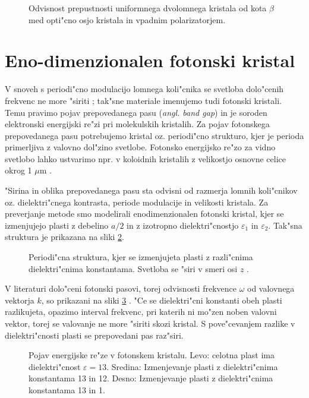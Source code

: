 \documentclass[12pt,twoside,openright,final,a4paper]{report}
\newcommand{\angl}[1]{(\textit{angl. #1})}
\begin{document}
\begin{figure}[h]
 
 \caption{Odvisnost prepustnosti uniformnega dvolomnega kristala od kota $\beta$ med opti"cno osjo kristala in vpadnim polarizatorjem. }
 \label{fig:test-uniform}
\end{figure}

\section{Eno-dimenzionalen fotonski kristal}
V snoveh s periodi"cno modulacijo lomnega koli"cnika se svetloba dolo"cenih frekvenc ne more "siriti \cite{hecht-nano,joannopoulos}; tak"sne materiale imenujemo tudi fotonski kristali. 
Temu pravimo pojav prepovedanega pasu \angl{band gap} in je soroden elektronski energijski re"zi pri molekulskih kristalih. 
Za pojav fotonskega prepovedanega pasu potrebujemo kristal oz. periodi"cno strukturo, kjer je perioda primerljiva z valovno dol"zino svetlobe. 
Fotonsko energijsko re"zo za vidno svetlobo lahko ustvarimo npr. v koloidnih kristalih z velikostjo osnovne celice okrog 1 $\mu$m \cite{colloidal-photonic-crystals}. 

"Sirina in oblika prepovedanega pasu sta odvisni od razmerja lomnih koli"cnikov oz. dielektri"cnega kontrasta, periode modulacije in velikosti kristala. 
Za preverjanje metode smo modelirali enodimenzionalen fotonski kristal, kjer se izmenjujejo plasti z debelino $a/2$ in z izotropno dielektri"cnostjo $\varepsilon_1$ in $\varepsilon_2$. 
Tak"sna struktura je prikazana na sliki \ref{fig:periodic-structure}. 

\begin{figure}[h]
 \centering
 
 \caption{Periodi"cna struktura, kjer se izmenjujeta plasti z razli"cnima dielektri"cnima konstantama. 
 Svetloba se "siri v smeri osi $z$ \cite{joannopoulos}. }
 \label{fig:periodic-structure}
\end{figure}

V literaturi dolo"ceni fotonski pasovi, torej odvisnosti frekvence $\omega$ od valovnega vektorja $k$, so prikazani na sliki \ref{fig:joannopoulos-crystal} \cite{joannopoulos}. 
"Ce se dielektri"cni konstanti obeh plasti razlikujeta, opazimo interval frekvenc, pri katerih ni mo"zen noben valovni vektor, torej se valovanje ne more "siriti skozi kristal. 
S pove"cevanjem razlike v dielektri"cnosti plasti se prepovedani pas raz"siri. 

\begin{figure}[h]
\centering
  {\footnotesize }
 \caption{Pojav energijske re"ze v fotonskem kristalu. Levo: celotna plast ima dielektri"cnost $\varepsilon = 13$. Sredina: Izmenjevanje plasti z dielektri"cnima konstantama 13 in 12. Desno: Izmenjevanje plasti z dielektri"cnima konstantama 13 in 1. \cite{joannopoulos}}
 \label{fig:joannopoulos-crystal}
\end{figure}
\end{document}
